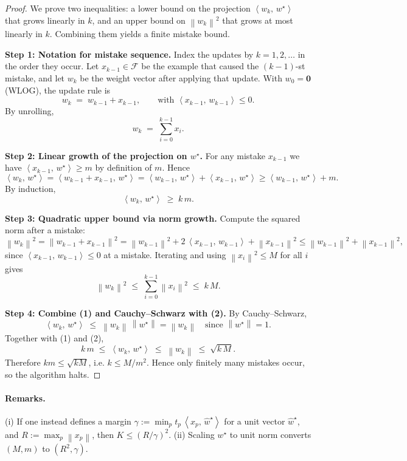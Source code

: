 \documentclass[11pt]{article}
\newcommand{\norm}[1]{\left\lVert #1 \right\rVert}
\newcommand{\inner}[2]{\left\langle #1,\, #2 \right\rangle}
\begin{document}
\begin{proof}
We prove two inequalities: a lower bound on the projection $\inner{w_k}{w^\star}$ that grows linearly in $k$, and an upper bound on $\norm{w_k}^2$ that grows at most linearly in $k$. Combining them yields a finite mistake bound.

\medskip
\noindent\textbf{Step 1: Notation for mistake sequence.}
Index the updates by $k=1,2,\dots$ in the order they occur. Let $x_{k-1}\in\mathcal{F}$ be the example that caused the $(k-1)$-st mistake, and let $w_k$ be the weight vector after applying that update. With $w_0=\mathbf{0}$ (WLOG), the update rule is
\[
w_{k} \;=\; w_{k-1} + x_{k-1}, \qquad \text{with } \inner{x_{k-1}}{w_{k-1}} \le 0.
\]
By unrolling,
\[
w_k \;=\; \sum_{i=0}^{k-1} x_i .
\]

\medskip
\noindent\textbf{Step 2: Linear growth of the projection on $w^\star$.}
For any mistake $x_{k-1}$ we have $\inner{x_{k-1}}{w^\star} \ge m$ by definition of $m$. Hence
\[
\inner{w_k}{w^\star}
= \inner{w_{k-1} + x_{k-1}}{w^\star}
= \inner{w_{k-1}}{w^\star} + \inner{x_{k-1}}{w^\star}
\ge \inner{w_{k-1}}{w^\star} + m .
\]
By induction,
\[
\inner{w_k}{w^\star} \;\ge\; k\, m .
\tag{1}
\]

\medskip
\noindent\textbf{Step 3: Quadratic upper bound via norm growth.}
Compute the squared norm after a mistake:
\[
\norm{w_k}^2
= \norm{w_{k-1} + x_{k-1}}^2
= \norm{w_{k-1}}^2 + 2\,\inner{x_{k-1}}{w_{k-1}} + \norm{x_{k-1}}^2
\le \norm{w_{k-1}}^2 + \norm{x_{k-1}}^2,
\]
since $\inner{x_{k-1}}{w_{k-1}} \le 0$ at a mistake. Iterating and using
$\norm{x_{i}}^2 \le M$ for all $i$ gives
\[
\norm{w_k}^2 \;\le\; \sum_{i=0}^{k-1} \norm{x_i}^2 \;\le\; k\, M .
\tag{2}
\]

\medskip
\noindent\textbf{Step 4: Combine (1) and Cauchy--Schwarz with (2).}
By Cauchy--Schwarz,
\[
\inner{w_k}{w^\star} \;\le\; \norm{w_k}\,\norm{w^\star} = \norm{w_k}
\quad\text{since }\norm{w^\star}=1.
\]
Together with (1) and (2),
\[
k\, m \;\le\; \inner{w_k}{w^\star} \;\le\; \norm{w_k} \;\le\; \sqrt{k\,M}.
\]
Therefore $k m \le \sqrt{k M}$, i.e. $k \le M/m^2$. Hence only finitely many mistakes occur, so the algorithm halts.
\end{proof}

\paragraph{Remarks.}
(i) If one instead defines a margin $\gamma := \min_{p} t_p\,\inner{x_p}{\hat w^\star}$ for a unit vector $\hat w^\star$, and $R:=\max_p \norm{x_p}$, then $K \le (R/\gamma)^2$. (ii) Scaling $w^\star$ to unit norm converts $(M,m)$ to $(R^2,\gamma)$.
\end{document}
